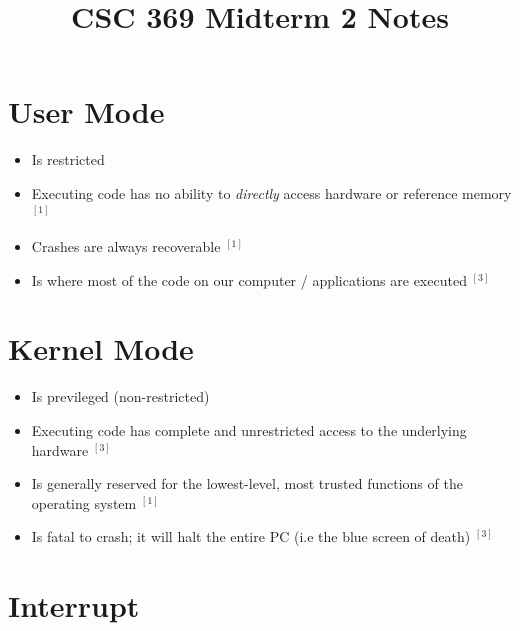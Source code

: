 \documentclass[12pt]{article}
\begin{document}
\title{CSC 369 Midterm 2 Notes}

\section{User Mode}

\begin{itemize}
    \item Is restricted
    \item Executing code has no ability to \textit{directly} access
    hardware or reference memory $^{[1]}$
    \item Crashes are always recoverable $^{[1]}$
    \item Is where most of the code on our computer / applications are executed $^{[3]}$
\end{itemize}

\section{Kernel Mode}
\begin{itemize}
    \item Is previleged (non-restricted)
    \item Executing code has complete and unrestricted access to the underlying hardware $^{[3]}$
    \item Is generally reserved for the lowest-level, most trusted functions of the operating
    system $^{[1]}$
    \item Is fatal to crash; it will halt the entire PC (i.e the blue screen of death) $^{[3]}$
\end{itemize}

\section{Interrupt}
\end{document}
